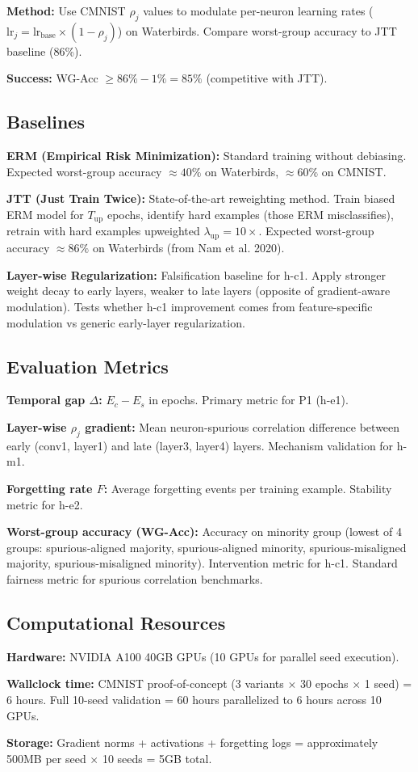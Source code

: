 \textbf{Method:} Use CMNIST $\rho_j$ values to modulate per-neuron learning rates ($\text{lr}_j = \text{lr}_{\text{base}} \times (1 - \rho_j)$) on Waterbirds. Compare worst-group accuracy to JTT baseline (86\%).

\textbf{Success:} WG-Acc $\geq 86\% - 1\% = 85\%$ (competitive with JTT).

\subsection{Baselines}

\textbf{ERM (Empirical Risk Minimization):} Standard training without debiasing. Expected worst-group accuracy $\approx 40\%$ on Waterbirds, $\approx 60\%$ on CMNIST.

\textbf{JTT (Just Train Twice):} State-of-the-art reweighting method. Train biased ERM model for $T_{\text{up}}$ epochs, identify hard examples (those ERM misclassifies), retrain with hard examples upweighted $\lambda_{\text{up}}=10\times$. Expected worst-group accuracy $\approx 86\%$ on Waterbirds (from Nam et al. 2020).

\textbf{Layer-wise Regularization:} Falsification baseline for h-c1. Apply stronger weight decay to early layers, weaker to late layers (opposite of gradient-aware modulation). Tests whether h-c1 improvement comes from feature-specific modulation vs generic early-layer regularization.

\subsection{Evaluation Metrics}

\textbf{Temporal gap $\Delta$:} $E_c - E_s$ in epochs. Primary metric for P1 (h-e1).

\textbf{Layer-wise $\rho_j$ gradient:} Mean neuron-spurious correlation difference between early (conv1, layer1) and late (layer3, layer4) layers. Mechanism validation for h-m1.

\textbf{Forgetting rate $F$:} Average forgetting events per training example. Stability metric for h-e2.

\textbf{Worst-group accuracy (WG-Acc):} Accuracy on minority group (lowest of 4 groups: spurious-aligned majority, spurious-aligned minority, spurious-misaligned majority, spurious-misaligned minority). Intervention metric for h-c1. Standard fairness metric for spurious correlation benchmarks.

\subsection{Computational Resources}

\textbf{Hardware:} NVIDIA A100 40GB GPUs (10 GPUs for parallel seed execution).

\textbf{Wallclock time:} CMNIST proof-of-concept (3 variants $\times$ 30 epochs $\times$ 1 seed) = 6 hours. Full 10-seed validation = 60 hours parallelized to 6 hours across 10 GPUs.

\textbf{Storage:} Gradient norms + activations + forgetting logs = approximately 500MB per seed $\times$ 10 seeds = 5GB total.
